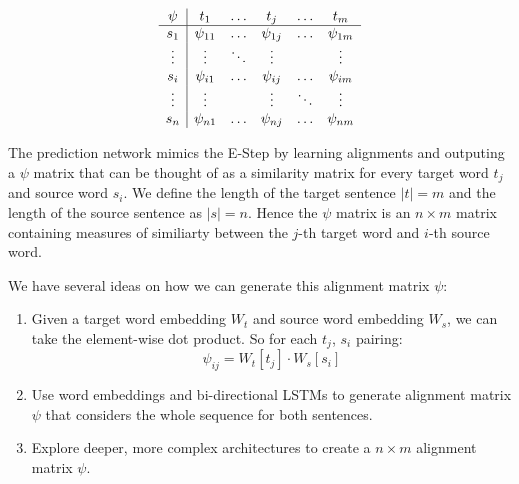 \documentclass[twoside,twocolumn]{article}
\begin{document}
\begin{equation}
  \centering
\begin{array}{c|ccccc}
\psi & t_1       & \hdots & t_j       & \hdots & t_m       \\ \hline
s_1  & \psi_{11} & \hdots & \psi_{1j} & \hdots & \psi_{1m} \\
\vdots  & \vdots & \ddots & \vdots &  & \vdots \\
s_i  & \psi_{i1} & \hdots & \psi_{ij} & \hdots & \psi_{im} \\
\vdots  & \vdots &  & \vdots & \ddots & \vdots \\
s_n  & \psi_{n1} & \hdots & \psi_{nj} & \hdots & \psi_{nm}
\end{array}
\end{equation}

The prediction network mimics the E-Step by learning alignments and outputing a $\psi$ matrix that can be thought of as a similarity matrix for every target word $t_j$ and source word $s_i$. We define the length of the target sentence $|t| = m$ and the length of the source sentence as $|s|=n$. Hence the $\psi$ matrix is an $n \times m$ matrix containing measures of similiarty between the $j$-th target word and $i$-th source word.

We have several ideas on how we can generate this alignment matrix $\psi$:
\begin{enumerate}
  \item Given a target word embedding $W_t$ and source word embedding $W_s$, we can take the element-wise dot product. So for each $t_j$, $s_i$ pairing:
  \begin{equation}
    \psi_{ij} = W_t[t_j] \cdot W_s[s_i]
  \end{equation}
  \item Use word embeddings and bi-directional LSTMs to generate alignment matrix $\psi$ that considers the whole sequence for both sentences.
  \item Explore deeper, more complex architectures to create a $n \times m$ alignment matrix $\psi$.
\end{enumerate}
\end{document}
